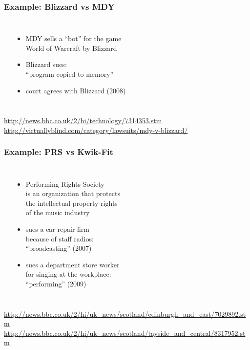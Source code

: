 \documentclass[dvipsnames]{beamer}
\theoremstyle{definition}
\theoremstyle{example}
\theoremstyle{plain}
\begin{document}
\begin{frame}
  \frametitle{Example: Blizzard vs MDY}

  \begin{columns}
    \begin{center}
    \end{center}

    \begin{itemize}
      \item MDY sells a ``bot'' for the game\\
        World of Warcraft by Blizzard
      \item Blizzard sues:\\
        ``program copied to memory''
      \item court agrees with Blizzard (2008)
    \end{itemize}
  \end{columns}

  \medskip
  \tiny{\url{http://news.bbc.co.uk/2/hi/technology/7314353.stm}}\\
  \tiny{\url{http://virtuallyblind.com/category/lawsuits/mdy-v-blizzard/}}\\
\end{frame}

\begin{frame}
  \frametitle{Example: PRS vs Kwik-Fit}

  \begin{columns}
    \begin{center}
    \end{center}

    \begin{itemize}
      \item Performing Rights Society\\
        is an organization that protects\\
        the intellectual property rights\\
        of the music industry
      \item sues a car repair firm\\
        because of staff radios:\\
        ``broadcasting'' (2007)
      \item sues a department store worker\\
        for singing at the workplace:\\
        ``performing'' (2009)
    \end{itemize}
  \end{columns}

  \medskip
  \tiny{\url{http://news.bbc.co.uk/2/hi/uk_news/scotland/edinburgh_and_east/7029892.stm}}\\
  \tiny{\url{http://news.bbc.co.uk/2/hi/uk_news/scotland/tayside_and_central/8317952.stm}}\\
\end{frame}
\end{document}
